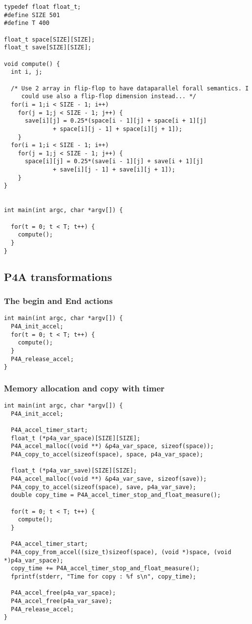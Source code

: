 \documentclass[a4paper]{article}
\begin{document}
\begin{lstlisting}
typedef float float_t;
#define SIZE 501
#define T 400

float_t space[SIZE][SIZE];
float_t save[SIZE][SIZE];

void compute() {
  int i, j;

  /* Use 2 array in flip-flop to have dataparallel forall semantics. I
     could use also a flip-flop dimension instead... */
  for(i = 1;i < SIZE - 1; i++)
    for(j = 1;j < SIZE - 1; j++) {
      save[i][j] = 0.25*(space[i - 1][j] + space[i + 1][j]
			  + space[i][j - 1] + space[i][j + 1]);
    }
  for(i = 1;i < SIZE - 1; i++)
    for(j = 1;j < SIZE - 1; j++) {
      space[i][j] = 0.25*(save[i - 1][j] + save[i + 1][j]
			  + save[i][j - 1] + save[i][j + 1]);
    }
}


int main(int argc, char *argv[]) {
  
  for(t = 0; t < T; t++) {
    compute();
  }
}
\end{lstlisting}

\subsection{P4A transformations}

\subsubsection{The begin and End actions}
\begin{lstlisting}
int main(int argc, char *argv[]) {
  P4A_init_accel;
  for(t = 0; t < T; t++) {
    compute();
  }
  P4A_release_accel;
}

\end{lstlisting}

\subsubsection{Memory allocation and copy with timer}
\begin{lstlisting}
int main(int argc, char *argv[]) {
  P4A_init_accel;

  P4A_accel_timer_start;
  float_t (*p4a_var_space)[SIZE][SIZE];
  P4A_accel_malloc((void **) &p4a_var_space, sizeof(space));
  P4A_copy_to_accel(sizeof(space), space, p4a_var_space);

  float_t (*p4a_var_save)[SIZE][SIZE];
  P4A_accel_malloc((void **) &p4a_var_save, sizeof(save));
  P4A_copy_to_accel(sizeof(space), save, p4a_var_save);
  double copy_time = P4A_accel_timer_stop_and_float_measure();

  for(t = 0; t < T; t++) {
    compute();
  }

  P4A_accel_timer_start;
  P4A_copy_from_accel((size_t)sizeof(space), (void *)space, (void *)p4a_var_space);
  copy_time += P4A_accel_timer_stop_and_float_measure();
  fprintf(stderr, "Time for copy : %f s\n", copy_time);

  P4A_accel_free(p4a_var_space);
  P4A_accel_free(p4a_var_save);
  P4A_release_accel;
}

\end{lstlisting}
\end{document}
